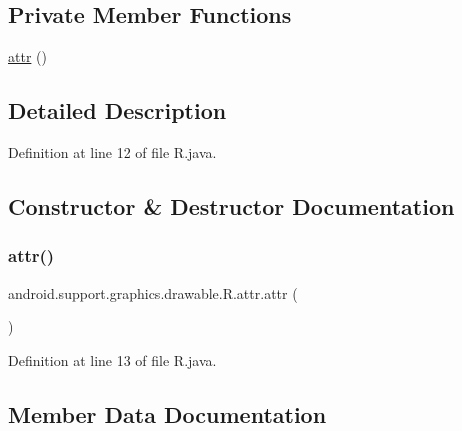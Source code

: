 \subsection*{Private Member Functions}
\begin{DoxyCompactItemize}
\item 
\mbox{\hyperlink{classandroid_1_1support_1_1graphics_1_1drawable_1_1_r_1_1attr_aa30e36906bf14403ab3c7b65f761cc0a}{attr}} ()
\end{DoxyCompactItemize}


\subsection{Detailed Description}


Definition at line 12 of file R.\+java.



\subsection{Constructor \& Destructor Documentation}
\mbox{\label{classandroid_1_1support_1_1graphics_1_1drawable_1_1_r_1_1attr_aa30e36906bf14403ab3c7b65f761cc0a}} 
\subsubsection{\texorpdfstring{attr()}{attr()}}
{\footnotesize\ttfamily android.\+support.\+graphics.\+drawable.\+R.\+attr.\+attr (\begin{DoxyParamCaption}{ }\end{DoxyParamCaption})\hspace{0.3cm}{\ttfamily [private]}}



Definition at line 13 of file R.\+java.


\begin{DoxyCode}{0}

\end{DoxyCode}


\subsection{Member Data Documentation}
\mbox{\label{classandroid_1_1support_1_1graphics_1_1drawable_1_1_r_1_1attr_a9a73a48a0e780ef66ff0ce470452bcb7}} 

